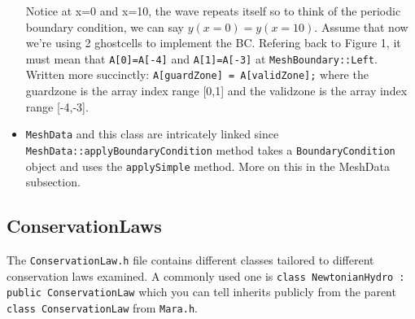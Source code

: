 \documentclass{article}
\begin{document}
\begin{itemize}
	Notice at x=0 and x=10, the wave repeats itself so to think of the periodic boundary condition, we can say $y(x=0)=y(x=10)$. Assume that now we're using 2 ghostcells to implement the BC. Refering back to Figure 1, it must mean that \texttt{A[0]=A[-4]} and \texttt{A[1]=A[-3]} at \texttt{MeshBoundary::Left}. Written more succinctly: \texttt{A[guardZone] = A[validZone];} where the guardzone is the array index range [0,1] and the validzone is the array index range [-4,-3]. 
	
	\item \texttt{MeshData} and this class are intricately linked since \texttt{MeshData::applyBoundaryCondition} method takes a \texttt{BoundaryCondition} object and uses the \texttt{applySimple} method. More on this in the MeshData subsection.
	
	
\end{itemize}

\subsection{ConservationLaws}
The \texttt{ConservationLaw.h} file contains different classes tailored to different conservation laws examined. A commonly used one is \texttt{class NewtonianHydro : public ConservationLaw} which you can tell inherits publicly from the parent \texttt{class ConservationLaw} from \texttt{Mara.h}. 
\end{document}
